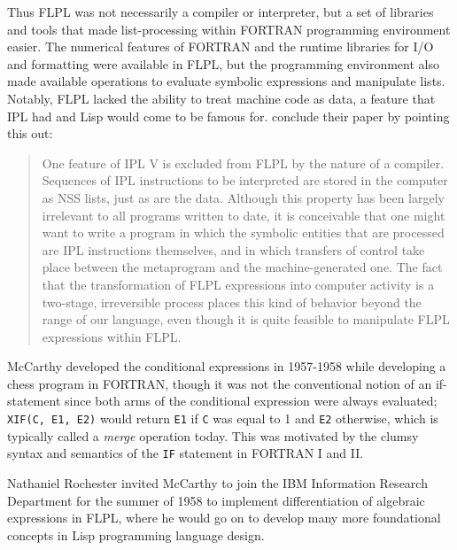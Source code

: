 Thus FLPL was not necessarily a compiler or interpreter, but a set of libraries and tools
that made list-processing within FORTRAN programming environment easier.
The numerical features of FORTRAN and the runtime libraries for I/O and formatting
were available in FLPL, but the programming environment also made available operations
to evaluate symbolic expressions and manipulate lists.
Notably, FLPL lacked the ability to treat machine code as data, a feature that IPL had
and Lisp would come to be famous for.
\citeauthor{gelernter_flpl_1960} conclude their paper by pointing this out:

\begin{quotation}
	One feature of IPL V is excluded from FLPL by the nature of a compiler.
	Sequences of IPL instructions to be interpreted are stored in the computer as
	NSS lists, just as are the data. Although this property has been largely irrelevant
	to all programs written to date, it is conceivable that one might want to write
	a program in which the symbolic entities that are processed are IPL instructions
	themselves, and in which transfers of control take place between the metaprogram and
	the machine-generated one. The fact that the transformation of
	FLPL expressions into computer activity is a two-stage, irreversible process
	places this kind of behavior beyond the range of our language, even though it is
	quite feasible to manipulate FLPL expressions within FLPL.
\end{quotation}

McCarthy developed the conditional expressions in 1957-1958 while developing a chess program
in FORTRAN, though it was not the conventional notion of an if-statement since both arms
of the conditional expression were always evaluated; \texttt{XIF(C, E1, E2)} would return
\texttt{E1} if \texttt{C} was equal to 1 and \texttt{E2} otherwise, which is typically called
a \textit{merge} operation today.
This was motivated by the clumsy syntax and semantics of the \texttt{IF} statement in FORTRAN I and II.

Nathaniel Rochester invited McCarthy to join the IBM Information Research Department for the
summer of 1958 to implement differentiation of algebraic expressions in FLPL,
where he would go on to develop many more foundational concepts in Lisp programming
language design.

